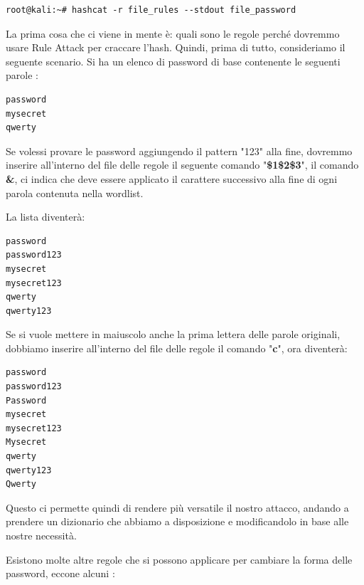 \begin{lstlisting}[caption={Utilizzo di regole su Hashcat }, style=javaScriptCode]
    root@kali:~# hashcat -r file_rules --stdout file_password
    \end{lstlisting}

La prima cosa che ci viene in mente è: quali sono le regole perché dovremmo usare Rule Attack per craccare l'hash. Quindi, prima di tutto, consideriamo il seguente scenario. Si ha un elenco di password di base contenente le seguenti parole :

\begin{lstlisting}[caption={Esempio rule attack wordlist}, style=javaScriptCode]
password
mysecret
qwerty
\end{lstlisting}
Se volessi provare le password aggiungendo il pattern "123" alla fine, dovremmo inserire all'interno del file delle regole il seguente comando "\textbf{\$1\$2\$3}", il comando \textbf{\&}, ci indica che deve essere applicato il carattere successivo alla fine di ogni parola contenuta nella wordlist.

La lista diventerà:
\begin{lstlisting}[caption={Risultato wordlist aggiunto il pattern "123"}, style=javaScriptCode]
password
password123
mysecret
mysecret123
qwerty
qwerty123
\end{lstlisting}

Se si vuole mettere in maiuscolo anche la prima lettera delle parole originali, dobbiamo inserire all'interno del file delle regole il comando "\textbf{c}", ora diventerà:
\begin{lstlisting}[caption={Esempio rule attack wordlist}, style=javaScriptCode]
password
password123
Password
mysecret
mysecret123
Mysecret
qwerty
qwerty123
Qwerty
\end{lstlisting}

Questo ci permette quindi di rendere più versatile il nostro attacco, andando a prendere un dizionario che abbiamo a disposizione e modificandolo in base alle nostre necessità.

Esistono molte altre regole che si possono applicare per cambiare la forma delle password, eccone alcuni :

